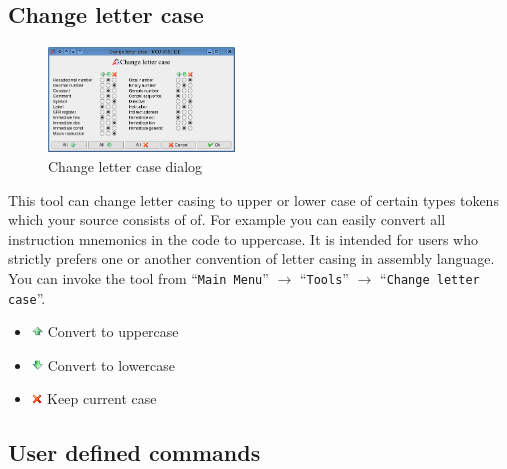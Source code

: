 \documentclass[a4paper,twoside,12pt]{book}
\newcommand{\menuitem}[1]{\texttt{#1}}
\begin{document}
		\subsection{Change letter case}
			\begin{figure}
				\centering{}
				\includegraphics[width=140pt]{img/042.png}
				\caption{Change letter case dialog}
			\end{figure}
			This tool can change letter casing to upper or lower case of certain types tokens which your source consists of of. For example you can easily convert all instruction mnemonics in the code to uppercase. It is intended for users who strictly prefers one or another convention of letter casing in assembly language. You can invoke the tool from ``\menuitem{Main Menu}'' $\rightarrow$ ``\menuitem{Tools}'' $\rightarrow$ ``\menuitem{Change letter case}''.
			\begin{itemize}
				\setlength{\itemsep}{-3pt}
				\item \includegraphics[height=8pt]{img/up0.png} Convert to uppercase
				\item \includegraphics[height=8pt]{img/down0.png} Convert to lowercase
				\item \includegraphics[height=8pt]{img/button_cancel.png} Keep current case

			\end{itemize}

		\subsection{User defined commands}
\end{document}
